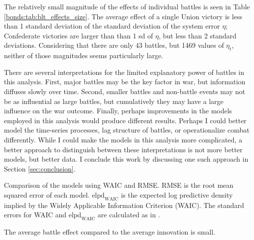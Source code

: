 The relatively small magnitude of the effects of individual battles is seen in Table \ref{bonds:tab:blt_effects_size}.
The average effect of a single Union victory is less than 1 standard deviation of the standard deviation of the system error $\eta$; Confederate victories are larger than than 1 sd of $\eta$, but less than 2 standard deviations.
Considering that there are only 43 battles, but 1469 values of $\eta_{t}$, neither of those magnitudes seems particularly large.

There are several interpretations for the limited explanatory power of battles in this analysis.
First, major battles may be the key factor in war, but information diffuses slowly over time.
Second, smaller battles and non-battle events may not be as influential as large battles, but cumulatively they may have a large influence on the war outcome.
Finally, perhaps improvements in the models employed in this analysis would produce different results.
Perhaps I could better model the time-series processes, lag structure of battles, or operationalize combat differently.
While I could make the models in this analysis more complicated, a better approach to distinguish between these interpretations is not more better models, but better data.
I conclude this work by discussing one such approach in Section \ref{sec:conclusion}.

\begin{table}[!htpb]
  \centering
  
  \caption[Model comparisons (WAIC, RMSE)]{
    Comparison of the models using WAIC and RMSE.
    RMSE is the root mean squared error of each model.
    $\text{elpd}_{\text{WAIC}}$ is the expected log predictive density implied by the Widely Applicable Information Criterion (WAIC).
    The standard errors for WAIC and $\text{elpd}_{\text{WAIC}}$ are calculated as in \textcite{GelmanVehtari2014a}.
  }
  \label{bonds:tab:waic}
\end{table}

\begin{table}[!htpb]
  \centering
  
  \caption{The average battle effect compared to the average innovation is small.}
  \label{bonds:tab:blt_effects_size}
\end{table}



